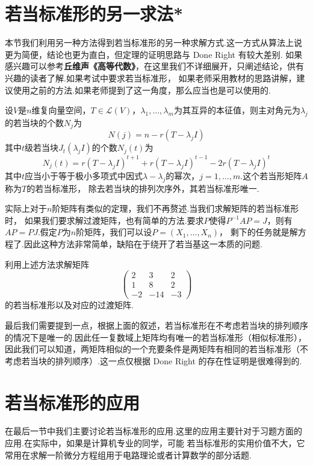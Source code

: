 \section{若当标准形的另一求法*}\label{sect:18:若当标准形的另一求法}
本节我们利用另一种方法得到若当标准形的另一种求解方式.这一方式从算法上说更为简便，结论也更为直白，但定理的证明思路与 Done Right 有较大差别.
如果感兴趣可以参考\textbf{丘维声《高等代数》}，在这里我们不详细展开，只阐述结论，供有兴趣的读者了解.如果考试中要求若当标准形，
如果老师采用教材的思路讲解，建议使用之前的方法.如果老师提到了这一角度，那么应当也是可以使用的.
\begin{theorem}
    设$V$是$n$维复向量空间，$T\in \mathcal{L}(V)$，$\lambda_1,\ldots,\lambda_m$为其互异的本征值，则主对角元为$\lambda_j$的若当块的个数$N_j$为
    \[N(j)=n-r(T-\lambda_jI)\]
    其中$t$级若当块$J_t(\lambda_jI)$的个数$N_j(t)$为
    \[N_j(t)=r(T-\lambda_jI)^{t+1}+r(T-\lambda_jI)^{t-1}-2r(T-\lambda_jI)^t\]
    其中$t$应当小于等于极小多项式中因式$\lambda-\lambda_j$的幂次，$j=1,\ldots,m$.这个若当形矩阵$A$称为$T$的若当标准形，
    除去若当块的排列次序外，其若当标准形唯一.
\end{theorem}
实际上对于$n$阶矩阵有类似的定理，我们不再赘述.当我们求解矩阵的若当标准形时，
如果我们要求解过渡矩阵，也有简单的方法.要求$P$使得$P^{-1}AP=J$，则有$AP=PJ$.假定$P$为$n$阶矩阵，我们可以设$P=(X_1,\ldots,X_n)$，
剩下的任务就是解方程了.因此这种方法非常简单，缺陷在于绕开了若当基这一本质的问题.
\begin{example}
    利用上述方法求解矩阵$$\begin{pmatrix}
        2 & 3 & 2 \\ 1 & 8 & 2 \\ -2 & -14 & -3
    \end{pmatrix}$$的若当标准形以及对应的过渡矩阵.
\end{example}
最后我们需要提到一点，根据上面的叙述，若当标准形在不考虑若当块的排列顺序的情况下是唯一的.因此任一复数域上矩阵均有唯一的若当标准形（相似标准形），
因此我们可以知道，两矩阵相似的一个充要条件是两矩阵有相同的若当标准形（不考虑若当块的排列顺序）.这一点仅根据 Done Right 的存在性证明是很难得到的.

\section{若当标准形的应用}
在最后一节中我们主要讨论若当标准形的应用.这里的应用主要针对于习题方面的应用.在实际中，如果是计算机专业的同学，可能
若当标准形的实用价值不大，它常用在求解一阶微分方程组用于电路理论或者计算数学的部分话题.

